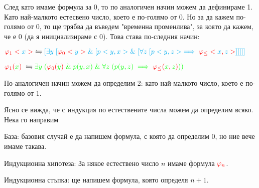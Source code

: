 \documentclass{article}[12pt]
\begin{document}
\vspace{0.3cm}

След като имаме формула за 0, то по аналогичен начин можем да дефинираме 1.
Като най-малкото естесвено число, което е по-голямо от 0.
Но за да кажем по-голямо от 0, то ще трябва да въведем "временна променлива",
за която да кажем, че е 0 (да я инициализираме с 0). Това става по-следния начин:

\vspace{0.3cm}

\(\color{red} \varphi_1<\color{cyan} x \color{red}> \color{black} \; \leftrightharpoons \color{cyan}  [\exists y \; [\color{red} \varphi_0<\color{cyan} y \color{red}> \color{cyan} \& \; [p<y, x> \& \; [\forall z \; [p<y, z> \implies \color{red} \varphi_\leq< \color{cyan} x \color{red} , \color{cyan} z \color{red}  > \color{cyan} ]]  ]]] \)

\vspace{0.3cm}

\(\color{red} \varphi_1(\color{green} x \color{red}) \color{black} \; \leftrightharpoons \color{green}  \exists y \; (\color{red} \varphi_0(\color{green} y \color{red}) \color{green} \; \& \; p(y, x) \; \& \; \forall z \; (p(y, z) \implies \color{red} \varphi_\leq( \color{green} x \color{red} , \color{green} z \color{red} ) \color{green} )) \)

\vspace{0.3cm}

По-аналогичен начин можем да определим  2: като най-малкото число, което е по-голямо от 1.

\vspace{0.3cm}

Ясно се вижда, че с индукция по естествените числа можем да определим всяко. Нека го направим

\vspace{0.3cm}

База: базовия случай е да напишем формула, с която да определим 0, но ние вече имаме такава.

\vspace{0.3cm}

Индукционна хипотеза: За някое естествено число \(n\) имаме формула \(\color{red} \varphi_n\).

\vspace{0.3cm}

Индукционна стъпка: ще напишем формула, която определя \(n + 1\).

\vspace{0.3cm}
\end{document}
